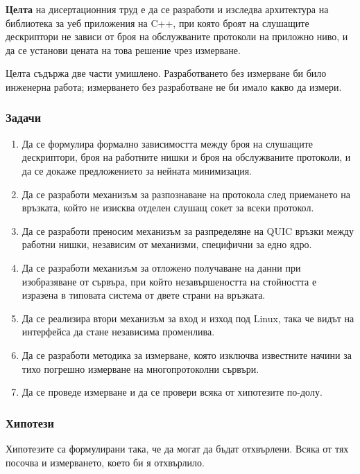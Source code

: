 \textbf{Целта} на дисертационния труд е да се разработи и изследва архитектура на библиотека
за уеб приложения на C++, при която броят на слушащите дескриптори не зависи от броя на
обслужваните протоколи на приложно ниво, и да се установи цената на това решение чрез
измерване.

Целта съдържа две части умишлено. Разработването без измерване би било инженерна работа;
измерването без разработване не би имало какво да измери.

\subsubsection{Задачи}

\begin{enumerate}[leftmargin=*, nosep]
  \item Да се формулира формално зависимостта между броя на слушащите дескриптори, броя на
        работните нишки и броя на обслужваните протоколи, и да се докаже предложението за
        нейната минимизация.
  \item Да се разработи механизъм за разпознаване на протокола след приемането на връзката,
        който не изисква отделен слушащ сокет за всеки протокол.
  \item Да се разработи преносим механизъм за разпределяне на QUIC връзки между работни
        нишки, независим от механизми, специфични за едно ядро.
  \item Да се разработи механизъм за отложено получаване на данни при изобразяване от
        сървъра, при който незавършеността на стойността е изразена в типовата система от
        двете страни на връзката.
  \item Да се реализира втори механизъм за вход и изход под Linux, така че видът на
        интерфейса да стане независима променлива.
  \item Да се разработи методика за измерване, която изключва известните начини за тихо
        погрешно измерване на многопротоколни сървъри.
  \item Да се проведе измерване и да се провери всяка от хипотезите по-долу.
\end{enumerate}

\subsubsection{Хипотези}

Хипотезите са формулирани така, че да могат да бъдат отхвърлени. Всяка от тях посочва и
измерването, което би я отхвърлило.

